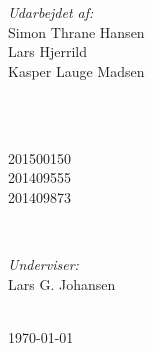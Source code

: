 \begin{titlepage}
		\begin{minipage}{0.4\textwidth}
			\begin{flushleft} \large
				\emph{Udarbejdet af:}\\
				Simon Thrane Hansen \\%
				Lars Hjerrild \\%
				Kasper Lauge Madsen
			\end{flushleft}
		\end{minipage}
		~
		\begin{minipage}{0.4\textwidth}
			\begin{flushright} \large
				\ \\
				201500150 \\%
				201409555\\ 	
				201409873 
			\end{flushright}
		\end{minipage}\\[2cm]
		
		
		\begin{minipage}{0.3\textwidth}
			\begin{center} \large
				\emph{Underviser:} \\
				Lars G. Johansen	
			\end{center}
		\end{minipage}\\[1cm]
	
		
		
		{\large \today}\\[3cm] %
		
	
		
\end{titlepage}
